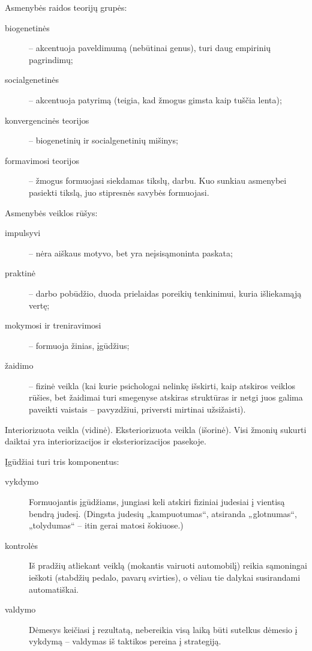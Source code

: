 Asmenybės raidos teorijų grupės:

\begin{description}
  \item[biogenetinės] – akcentuoja paveldimumą (nebūtinai genus), turi
    daug empirinių pagrindimų;
  \item[socialgenetinės] – akcentuoja patyrimą (teigia, kad žmogus gimsta
    kaip tuščia lenta);
  \item[konvergencinės teorijos] – biogenetinių ir socialgenetinių mišinys;
  \item[formavimosi teorijos]  – žmogus formuojasi siekdamas tikslų, darbu.
    Kuo sunkiau asmenybei pasiekti tikslą, juo stipresnės savybės 
    formuojasi.
\end{description}

Asmenybės veiklos rūšys:

\begin{description}
  \item[impulsyvi] – nėra aiškaus motyvo, bet yra neįsisąmoninta paskata;
  \item[praktinė] – darbo pobūdžio, duoda prielaidas poreikių tenkinimui,
    kuria išliekamąją vertę; %
  \item[mokymosi ir treniravimosi] – formuoja žinias, įgūdžius;
  \item[žaidimo] – fizinė veikla (kai kurie psichologai nelinkę išskirti,
    kaip atskiros veiklos rūšies, bet žaidimai turi smegenyse atskiras 
    struktūras ir netgi juos galima paveikti vaistais – pavyzdžiui, 
    priversti mirtinai užsižaisti).
\end{description}

Interiorizuota veikla (vidinė).
Eksteriorizuota veikla (išorinė).
Visi žmonių sukurti daiktai yra interiorizacijos ir eksteriorizacijos
pasekoje.

Įgūdžiai turi tris komponentus:

\begin{description}
  \item[vykdymo] Formuojantis įgūdžiams, jungiasi keli atskiri fiziniai
    judesiai į vientisą bendrą judesį. (Dingsta judesių „kampuotumas“, 
    atsiranda „glotnumas“, „tolydumas“ – itin gerai matosi šokiuose.)
  \item[kontrolės] 
    Iš pradžių atliekant veiklą (mokantis vairuoti automobilį)
    reikia sąmoningai ieškoti (stabdžių pedalo, pavarų svirties), o vėliau
    tie dalykai susirandami automatiškai.
  \item[valdymo] Dėmesys keičiasi į rezultatą, nebereikia visą laiką
    būti sutelkus dėmesio į vykdymą – valdymas iš taktikos pereina į
    strategiją.
\end{description}

